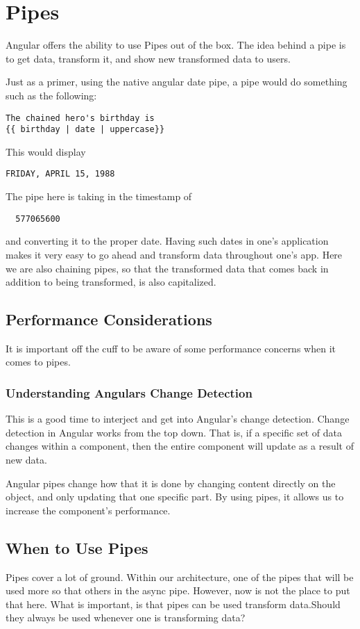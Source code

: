 \chapter{ Pipes }

Angular offers the ability to use Pipes out of the box. The idea behind a pipe is to get data, transform it, and show new transformed data to users. 

Just as a primer, using the native angular date pipe, a pipe would do something such as the following:
\begin{lstlisting}
The chained hero's birthday is
{{ birthday | date | uppercase}}
\end{lstlisting}

This would display
\begin{verbatim}
FRIDAY, APRIL 15, 1988
\end{verbatim}

The pipe here is taking in the timestamp of
\begin{verbatim}
  577065600
\end{verbatim}
and converting it to the proper date. Having such dates in one's application makes it very easy to go ahead and transform data throughout one's app. Here we are also chaining pipes, so that the transformed data that comes back in addition to being transformed, is also capitalized.

\section{ Performance Considerations }
It is important off the cuff to be aware of some performance concerns when it comes to pipes.

\subsection{ Understanding Angulars Change Detection }
This is a good time to interject and get into Angular's change detection. Change detection in Angular works from the top down. That is, if a specific set of data changes within a component, then the entire component will update as a result of new data. 

Angular pipes change how that it is done by changing content directly on the object, and only updating that one specific part. By using pipes, it allows us to increase the component's performance. 

\section{ When to Use Pipes }
Pipes cover a lot of ground. Within our architecture, one of the pipes that will be used more so that others in the async pipe. However, now is not the place to put that here. What is important, is that pipes can be used transform data.Should they always be used whenever one is transforming data?

